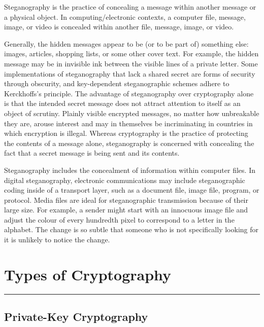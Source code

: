 \documentclass[british]{report}
\begin{document}
Steganography is the practice of concealing a message within another
message or a physical object. In computing/electronic contexts, a
computer file, message, image, or video is concealed within another
file, message, image, or video.

Generally, the hidden messages appear to be (or to be part of) something
else: images, articles, shopping lists, or some other cover text.
For example, the hidden message may be in invisible ink between the
visible lines of a private letter. Some implementations of steganography
that lack a shared secret are forms of security through obscurity,
and key-dependent steganographic schemes adhere to Kerckhoffs's principle.
The advantage of steganography over cryptography alone is that the
intended secret message does not attract attention to itself as an
object of scrutiny. Plainly visible encrypted messages, no matter
how unbreakable they are, arouse interest and may in themselves be
incriminating in countries in which encryption is illegal. Whereas
cryptography is the practice of protecting the contents of a message
alone, steganography is concerned with concealing the fact that a
secret message is being sent and its contents.

Steganography includes the concealment of information within computer
files. In digital steganography, electronic communications may include
steganographic coding inside of a transport layer, such as a document
file, image file, program, or protocol. Media files are ideal for
steganographic transmission because of their large size. For example,
a sender might start with an innocuous image file and adjust the colour
of every hundredth pixel to correspond to a letter in the alphabet.
The change is so subtle that someone who is not specifically looking
for it is unlikely to notice the change.

\vfill{}

\pagebreak{}

\chapter{Types of Cryptography}
\begin{center}
	\rule[0.5ex]{450bp}{0.75pt}
	\par\end{center}

\section{Private-Key Cryptography}
\end{document}
